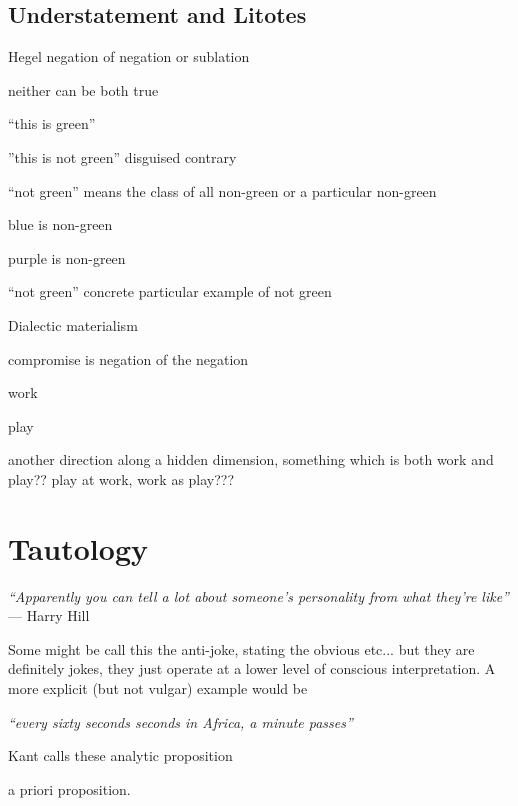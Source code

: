 \subsection{Understatement and Litotes}

Hegel negation of negation or sublation

neither can be both true

``this is green'' 

''this is not green'' disguised contrary

``not green'' means the class of all non-green or a particular non-green

blue is non-green

purple is non-green

``not green'' concrete particular example of not green


Dialectic materialism

compromise is negation of the negation

work

play

another direction along a hidden dimension, something which is both work and play?? play at work, work as play???



\section{Tautology}


\begin{center}
\textit{``Apparently you can tell a lot about someone's personality from what they're like''}\\ --- Harry Hill
\end{center}

Some might be call this the anti-joke, stating the obvious etc... but they are definitely jokes, they just operate at a lower level of conscious interpretation. A more explicit (but not vulgar) example would be

\textit{``every sixty seconds seconds in Africa, a minute passes''}



Kant calls these analytic proposition

a priori proposition.

